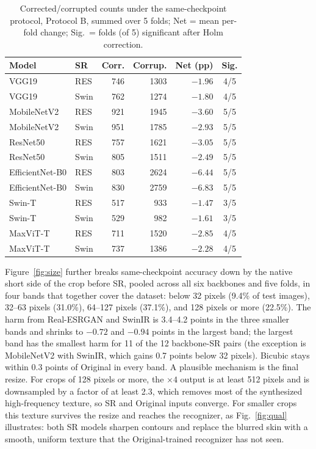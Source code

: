\documentclass[conference]{IEEEtran}
\begin{document}
\begin{table}[t]
\centering
\caption{Corrected/corrupted counts under the same-checkpoint protocol, Protocol B, summed over 5 folds; Net = mean per-fold change; Sig.\ = folds (of 5) significant after Holm correction.}
\label{tab:flips}
\small
\begin{tabular}{@{}llrrrc@{}}
\toprule
Model & SR & Corr. & Corrup. & Net (pp) & Sig. \\
\midrule
VGG19            & RES & 746 & 1303 & $-1.96$ & 4/5 \\
VGG19            & Swin & 762 & 1274 & $-1.80$ & 4/5 \\
MobileNetV2      & RES & 921 & 1945 & $-3.60$ & 5/5 \\
MobileNetV2      & Swin & 951 & 1785 & $-2.93$ & 5/5 \\
ResNet50         & RES & 757 & 1621 & $-3.05$ & 5/5 \\
ResNet50         & Swin & 805 & 1511 & $-2.49$ & 5/5 \\
EfficientNet-B0  & RES & 803 & 2624 & $-6.44$ & 5/5 \\
EfficientNet-B0  & Swin & 830 & 2759 & $-6.83$ & 5/5 \\
Swin-T           & RES & 517 & 933  & $-1.47$ & 3/5 \\
Swin-T           & Swin & 529 & 982  & $-1.61$ & 3/5 \\
MaxViT-T         & RES & 711 & 1520 & $-2.85$ & 4/5 \\
MaxViT-T         & Swin & 737 & 1386 & $-2.28$ & 4/5 \\
\bottomrule
\end{tabular}
\end{table}

Figure~\ref{fig:size} further breaks same-checkpoint accuracy down by the native short side of the crop before SR, pooled across all six backbones and five folds, in four bands that together cover the dataset: below 32 pixels (9.4\% of test images), 32--63 pixels (31.0\%), 64--127 pixels (37.1\%), and 128 pixels or more (22.5\%). The harm from Real-ESRGAN and SwinIR is 3.4--4.2 points in the three smaller bands and shrinks to $-0.72$ and $-0.94$ points in the largest band; the largest band has the smallest harm for 11 of the 12 backbone-SR pairs (the exception is MobileNetV2 with SwinIR, which gains 0.7 points below 32 pixels). Bicubic stays within 0.3 points of Original in every band. A plausible mechanism is the final resize. For crops of 128 pixels or more, the $\times4$ output is at least 512 pixels and is downsampled by a factor of at least 2.3, which removes most of the synthesized high-frequency texture, so SR and Original inputs converge. For smaller crops this texture survives the resize and reaches the recognizer, as Fig.~\ref{fig:qual} illustrates: both SR models sharpen contours and replace the blurred skin with a smooth, uniform texture that the Original-trained recognizer has not seen.
\end{document}
